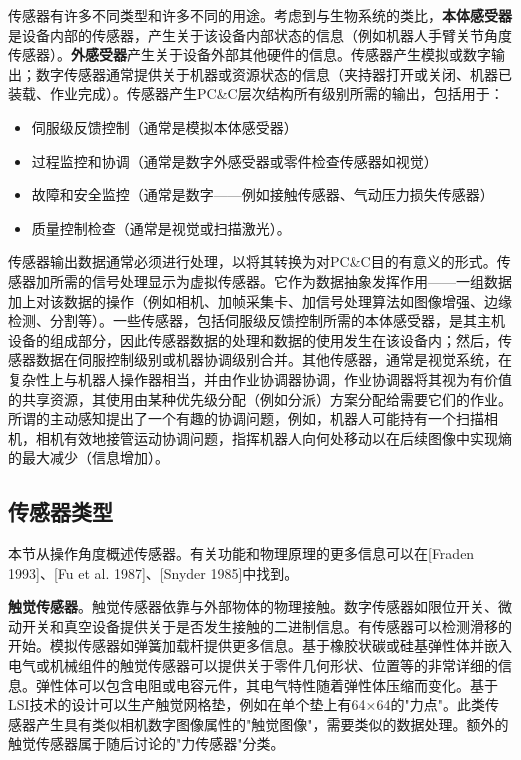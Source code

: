 \documentclass[UTF8,a4paper]{ctexart}
\begin{document}
传感器有许多不同类型和许多不同的用途。考虑到与生物系统的类比，\textbf{本体感受器}是设备内部的传感器，产生关于该设备内部状态的信息（例如机器人手臂关节角度传感器）。\textbf{外感受器}产生关于设备外部其他硬件的信息。传感器产生模拟或数字输出；数字传感器通常提供关于机器或资源状态的信息（夹持器打开或关闭、机器已装载、作业完成）。传感器产生PC\&C层次结构所有级别所需的输出，包括用于：
\begin{itemize}
    \item 伺服级反馈控制（通常是模拟本体感受器）
    \item 过程监控和协调（通常是数字外感受器或零件检查传感器如视觉）
    \item 故障和安全监控（通常是数字——例如接触传感器、气动压力损失传感器）
    \item 质量控制检查（通常是视觉或扫描激光）。
\end{itemize}

传感器输出数据通常必须进行处理，以将其转换为对PC\&C目的有意义的形式。传感器加所需的信号处理显示为虚拟传感器。它作为数据抽象发挥作用——一组数据加上对该数据的操作（例如相机、加帧采集卡、加信号处理算法如图像增强、边缘检测、分割等）。一些传感器，包括伺服级反馈控制所需的本体感受器，是其主机设备的组成部分，因此传感器数据的处理和数据的使用发生在该设备内；然后，传感器数据在伺服控制级别或机器协调级别合并。其他传感器，通常是视觉系统，在复杂性上与机器人操作器相当，并由作业协调器协调，作业协调器将其视为有价值的共享资源，其使用由某种优先级分配（例如分派）方案分配给需要它们的作业。所谓的主动感知提出了一个有趣的协调问题，例如，机器人可能持有一个扫描相机，相机有效地接管运动协调问题，指挥机器人向何处移动以在后续图像中实现熵的最大减少（信息增加）。

\subsection{传感器类型}

本节从操作角度概述传感器。有关功能和物理原理的更多信息可以在[Fraden 1993]、[Fu et al. 1987]、[Snyder 1985]中找到。

\textbf{触觉传感器}。触觉传感器依靠与外部物体的物理接触。数字传感器如限位开关、微动开关和真空设备提供关于是否发生接触的二进制信息。有传感器可以检测滑移的开始。模拟传感器如弹簧加载杆提供更多信息。基于橡胶状碳或硅基弹性体并嵌入电气或机械组件的触觉传感器可以提供关于零件几何形状、位置等的非常详细的信息。弹性体可以包含电阻或电容元件，其电气特性随着弹性体压缩而变化。基于LSI技术的设计可以生产触觉网格垫，例如在单个垫上有64×64的"力点"。此类传感器产生具有类似相机数字图像属性的"触觉图像"，需要类似的数据处理。额外的触觉传感器属于随后讨论的"力传感器"分类。
\end{document}
